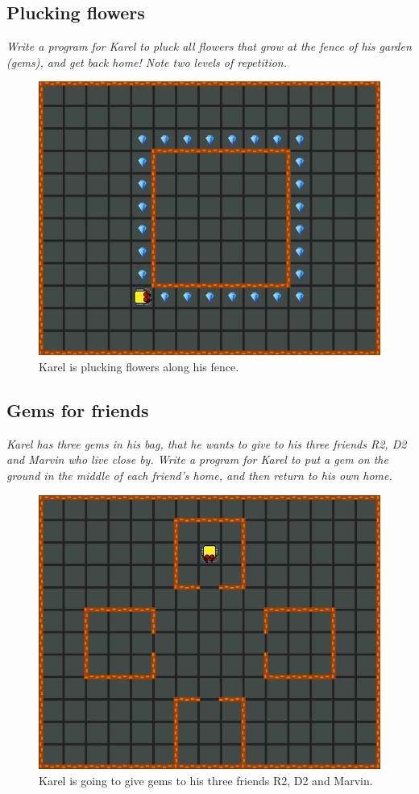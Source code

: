{{\subsection{Plucking flowers}

{\em Write a program for Karel to pluck all flowers that grow at the fence of his garden (gems), and get back home! Note two levels of repetition.}


\begin{figure}[!ht]
\begin{center}
\includegraphics[height=0.4\textwidth]{img/f07.png}
\end{center}
\vspace{-4mm}
\caption{Karel is plucking flowers along his fence.}
\label{fig:f07}
\end{figure}



\subsection{Gems for friends}

{\em Karel has three gems in his bag, that he wants to give to his three friends R2, D2 and Marvin who live close by. Write a program for Karel to put a gem on the ground in the middle of each friend's home, and then return to his own home.}


\begin{figure}[!ht]
\begin{center}
\includegraphics[height=0.4\textwidth]{img/f08.png}
\end{center}
\vspace{-4mm}
\caption{Karel is going to give gems to his three friends R2, D2 and Marvin.}
\label{fig:f08}
\vspace{-10mm}
\end{figure}



}}
